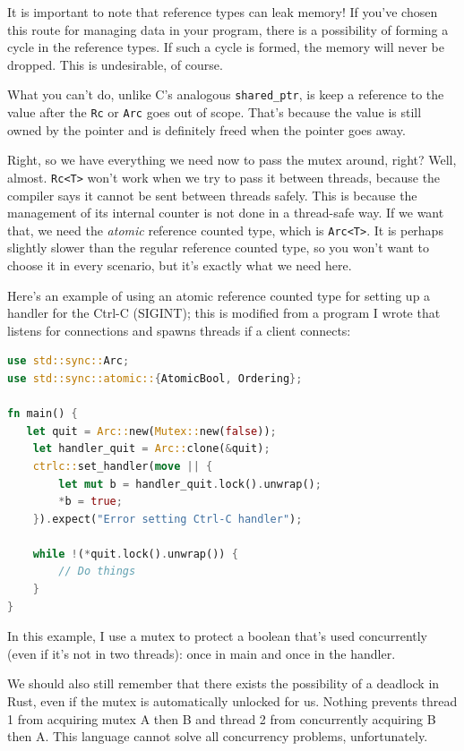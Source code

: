 \documentclass[a4paper]{report}
\newcommand{\CPP}{C\nolinebreak\hspace{-.05em}\raisebox{.4ex}{\tiny\bf +}\nolinebreak\hspace{-.10em}\raisebox{.4ex}{\tiny\bf +}}
\def\CPP{{C\nolinebreak[4]\hspace{-.05em}\raisebox{.4ex}{\tiny\bf ++}}}
\begin{document}
It is important to note that reference types can leak memory! If you've chosen this route for managing data in your program, there is a possibility of forming a cycle in the reference types. If such a cycle is formed, the memory will never be dropped. This is undesirable, of course.

What you can't do, unlike \CPP's analogous \texttt{shared\_ptr}, is keep a reference to the value after the \texttt{Rc} or \texttt{Arc} goes out of scope. That's because the value is still owned by the pointer and is definitely freed when the pointer goes away.

Right, so we have everything we need now to pass the mutex around, right? Well, almost. \texttt{Rc<T>} won't work when we try to pass it between threads, because the compiler says it cannot be sent between threads safely. This is because the management of its internal counter is not done in a thread-safe way. If we want that, we need the \textit{atomic} reference counted type, which is \texttt{Arc<T>}. It is perhaps slightly slower than the regular reference counted type, so you won't want to choose it in every scenario, but it's exactly what we need here.

Here's an example of using an atomic reference counted type for setting up a handler for the Ctrl-C (SIGINT); this is modified from a program I wrote that listens for connections and spawns threads if a client connects: 

\begin{lstlisting}[language=Rust]
use std::sync::Arc;
use std::sync::atomic::{AtomicBool, Ordering};

fn main() {
   let quit = Arc::new(Mutex::new(false));
    let handler_quit = Arc::clone(&quit);
    ctrlc::set_handler(move || {
        let mut b = handler_quit.lock().unwrap();
        *b = true;
    }).expect("Error setting Ctrl-C handler");
 
    while !(*quit.lock().unwrap()) {
    	// Do things
    }
}
\end{lstlisting}

In this example, I use a mutex to protect a boolean that's used concurrently (even if it's not in two threads): once in main and once in the handler. 

We should also still remember that there exists the possibility of a deadlock in Rust, even if the mutex is automatically unlocked for us. Nothing prevents thread 1 from acquiring mutex A then B and thread 2 from concurrently acquiring B then A. This language cannot solve all concurrency problems, unfortunately.
\end{document}
